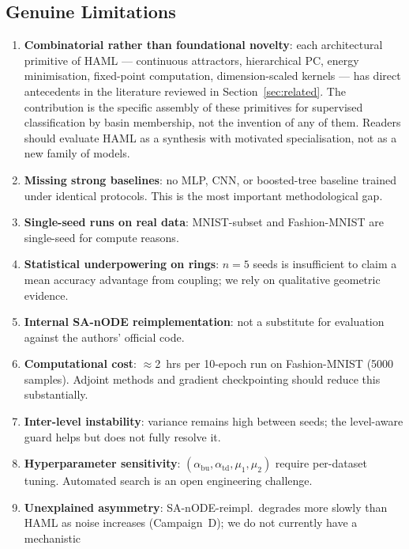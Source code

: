 \documentclass[11pt,a4paper]{article}
\begin{document}
\subsection{Genuine Limitations}
\label{sec:discussion:limitations}

\begin{enumerate}
  \item \textbf{Combinatorial rather than foundational novelty}: each architectural
        primitive of HAML --- continuous attractors, hierarchical PC, energy
        minimisation, fixed-point computation, dimension-scaled kernels --- has direct
        antecedents in the literature reviewed in Section~\ref{sec:related}. The
        contribution is the specific assembly of these primitives for supervised
        classification by basin membership, not the invention of any of them. Readers
        should evaluate HAML as a synthesis with motivated specialisation, not as a
        new family of models.
  \item \textbf{Missing strong baselines}: no MLP, CNN, or boosted-tree baseline trained
        under identical protocols. This is the most important methodological gap.
  \item \textbf{Single-seed runs on real data}: MNIST-subset and Fashion-MNIST are
        single-seed for compute reasons.
  \item \textbf{Statistical underpowering on rings}: $n=5$ seeds is insufficient to claim
        a mean accuracy advantage from coupling; we rely on qualitative geometric
        evidence.
  \item \textbf{Internal SA-nODE reimplementation}: not a substitute for evaluation
        against the authors' official code.
  \item \textbf{Computational cost}: $\approx$2~hrs per 10-epoch run on Fashion-MNIST
        (5000 samples). Adjoint methods and gradient checkpointing should reduce this
        substantially.
  \item \textbf{Inter-level instability}: variance remains high between seeds; the
        level-aware guard helps but does not fully resolve it.
  \item \textbf{Hyperparameter sensitivity}: $(\alpha_{\mathrm{bu}}, \alpha_{\mathrm{td}}, \mu_1, \mu_2)$
        require per-dataset tuning. Automated search is an open engineering challenge.
  \item \textbf{Unexplained asymmetry}: SA-nODE-reimpl.\ degrades more slowly than HAML
        as noise increases (Campaign~D); we do not currently have a mechanistic

\end{enumerate}
\end{document}
